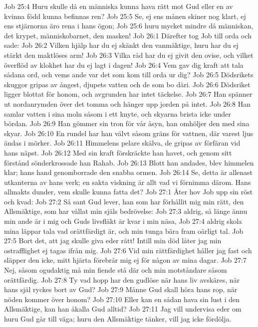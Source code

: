 Job 25:4  Huru skulle då en människa kunna hava rätt mot Gud eller en av kvinna född kunna befinnas ren?
Job 25:5  Se, ej ens månen skiner nog klart, ej ens stjärnorna äro rena i hans ögon;
Job 25:6  huru mycket mindre då människan, det krypet, människobarnet, den masken!
Job 26:1  Därefter tog Job till orda och sade:
Job 26:2  Vilken hjälp har du ej skänkt den vanmäktige, huru har du ej stärkt den maktlöses arm!
Job 26:3  Vilka råd har du ej givit den ovise, och vilket överflöd av klokhet har du ej lagt i dagen!
Job 26:4  Vem gav dig kraft att tala sådana ord, och vems ande var det som kom till orda ur dig?
Job 26:5  Dödsrikets skuggor gripas av ångest, djupets vatten och de som bo däri.
Job 26:6  Dödsriket ligger blottat för honom, och avgrunden har intet täckelse.
Job 26:7  Han spänner ut nordanrymden över det tomma och hänger upp jorden på intet.
Job 26:8  Han samlar vatten i sina moln såsom i ett knyte, och skyarna brista icke under bördan.
Job 26:9  Han gömmer sin tron för vår åsyn, han omhöljer den med sina skyar.
Job 26:10  En rundel har han välvt såsom gräns för vattnen, där varest ljus ändas i mörker.
Job 26:11  Himmelens pelare skälva, de gripas av förfäran vid hans näpst.
Job 26:12  Med sin kraft förskräckte han havet, och genom sitt förstånd sönderkrossade han Rahab.
Job 26:13  Blott han andades, blev himmelen klar; hans hand genomborrade den snabba ormen.
Job 26:14  Se, detta är allenast utkanterna av hans verk; en sakta viskning är allt vad vi förnimma därom. Hans allmakts dunder, vem skulle kunna fatta det?
Job 27:1  Åter hov Job upp sin röst och kvad:
Job 27:2  Så sant Gud lever, han som har förhållit mig min rätt, den Allsmäktige, som har vållat min själs bedrövelse:
Job 27:3  aldrig, så länge ännu min ande är i mig och Guds livsfläkt är kvar i min näsa,
Job 27:4  aldrig skola mina läppar tala vad orättfärdigt är, och min tunga bära fram oärligt tal.
Job 27:5  Bort det, att jag skulle giva eder rätt! Intill min död låter jag min ostrafflighet ej tagas ifrån mig.
Job 27:6  Vid min rättfärdighet håller jag fast och släpper den icke, mitt hjärta förebrår mig ej för någon av mina dagar.
Job 27:7  Nej, såsom ogudaktig må min fiende stå där och min motståndare såsom orättfärdig.
Job 27:8  Ty vad hopp har den gudlöse när hans liv avskäres, när hans själ ryckes bort av Gud?
Job 27:9  Månne Gud skall höra hans rop, när nöden kommer över honom?
Job 27:10  Eller kan en sådan hava sin lust i den Allsmäktige, kan han åkalla Gud alltid?
Job 27:11  Jag vill undervisa eder om huru Gud går till väga; huru den Allsmäktige tänker, vill jag icke fördölja.
